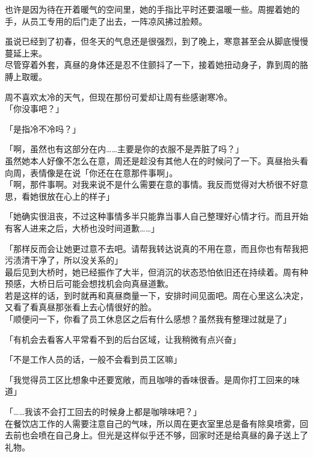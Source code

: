 也许是因为待在开着暖气的空间里，她的手指比平时还要温暖一些。周握着她的手，从员工专用的后门走了出去，一阵凉风拂过脸颊。

虽说已经到了初春，但冬天的气息还是很强烈，到了晚上，寒意甚至会从脚底慢慢蔓延上来。\\

尽管穿着外套，真昼的身体还是忍不住颤抖了一下，接着她扭动身子，靠到周的胳膊上取暖。

周不喜欢太冷的天气，但现在那份可爱却让周有些感谢寒冷。\\

「你没事吧？」

「是指冷不冷吗？」

「啊，虽然也有这部分在内……主要是你的衣服不是弄脏了吗？」\\

虽然她本人好像不怎么在意，周还是趁没有其他人在的时候问了一下。真昼抬头看向周，表情像是在说「你还在在意那件事啊」。\\

「啊，那件事啊。对我来说不是什么需要在意的事情。我反而觉得对大桥很不好意思，看她很放在心上的样子」

「她确实很沮丧，不过这种事情多半只能靠当事人自己整理好心情才行。而且开始有客人进来之后，大桥也没时间道歉……」

「那样反而会让她更过意不去吧。请帮我转达说真的不用在意，而且你也有帮我把污渍清干净了，所以没关系的」\\

最后见到大桥时，她已经振作了大半，但消沉的状态恐怕依旧还在持续着。周有种预感，大桥日后可能会想找机会向真昼道歉。\\

若是这样的话，到时就再和真昼商量一下，安排时间见面吧。周在心里这么决定，又看了看真昼那张看上去心情很好的脸。\\

「顺便问一下，你看了员工休息区之后有什么感想？虽然我有整理过就是了」

「有机会去看客人平常看不到的后台区域，让我稍微有点兴奋」

「不是工作人员的话，一般不会看到员工区嘛」

「我觉得员工区比想象中还要宽敞，而且咖啡的香味很香。是周你打工回来的味道」

「……我该不会打工回去的时候身上都是咖啡味吧？」\\

在餐饮店工作的人需要注意自己的气味，所以周在更衣室里总是备有除臭喷雾，回去前也会喷在自己身上。但光是这样似乎还不够，回家时还是给真昼的鼻子送上了礼物。

